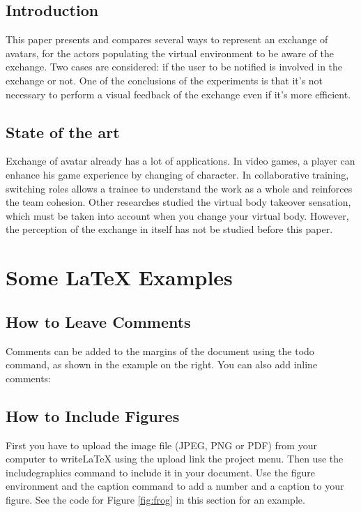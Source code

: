 \documentclass[a4paper]{article}
\begin{document}
\subsection{Introduction}

This paper presents and compares several ways to represent an exchange of avatars, for the actors populating the virtual environment to be aware of the exchange. Two cases are considered: if the user to be notified is involved in the exchange or not. One of the conclusions of the experiments is that it's not necessary to perform a visual feedback of the exchange even if it's more efficient.

\subsection{State of the art}

Exchange of avatar already has a lot of applications. In video games, a player can enhance his game experience by changing of character. In collaborative training, switching roles allows a trainee to understand the work as a whole and reinforces the team cohesion. Other researches studied the virtual body takeover sensation, which must be taken into account when you change your virtual body. However, the perception of the exchange in itself has not be studied before this paper.

\section{Some \LaTeX{} Examples}
\label{sec:examples}

\subsection{How to Leave Comments}

Comments can be added to the margins of the document using the  todo command, as shown in the example on the right. You can also add inline comments:


\subsection{How to Include Figures}

First you have to upload the image file (JPEG, PNG or PDF) from your computer to writeLaTeX using the upload link the project menu. Then use the includegraphics command to include it in your document. Use the figure environment and the caption command to add a number and a caption to your figure. See the code for Figure \ref{fig:frog} in this section for an example.
\end{document}
